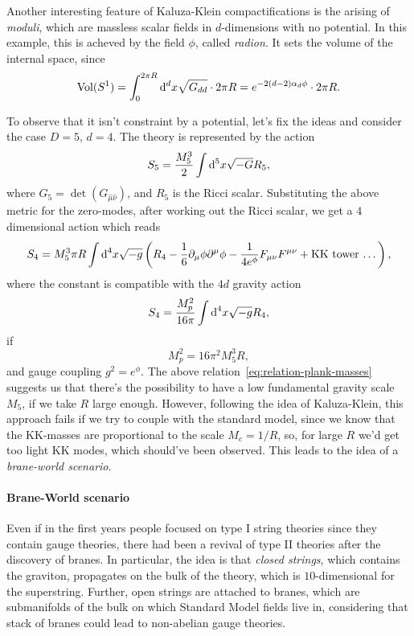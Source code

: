 Another interesting feature of Kaluza-Klein compactifications is the arising of \emph{moduli}, which are massless scalar fields in $d$-dimensions with no potential. In this example, this is acheved by the field $\phi$, called \emph{radion}. It sets the volume of the internal space, since
\begin{equation}
    \textup{Vol} (S^1)  = \int_{0}^{2\pi R} \mathop{}\!\mathrm{d}^d x \sqrt{G_{dd}} \cdot 2\pi R = e^{-2(d-2)\alpha_d \phi} \cdot 2\pi R .
\end{equation}

To observe that it isn't constraint by a potential, let's fix the ideas and consider the case $D=5$, $d=4$. The theory is represented by the action
\begin{equation}
    S_5 = \frac{M^3_5}{2} \int \mathop{}\!\mathrm{d}^5 x \sqrt{-G} R_5,
\end{equation}
where $G_5 = \det(G_{\hat{\mu} \hat{\nu}})$, and $R_5$ is the Ricci scalar. Substituting the above metric for the zero-modes, after working out the Ricci scalar, we get a $4$ dimensional action which reads
\begin{equation}
    S_4 = M^3_5 \pi R \int {\mathop{}\!\mathrm{d}}^4 x \sqrt{-g} \left( R_4 -\frac{1}{6} \partial_\mu \phi \partial^\mu \phi - \frac{1}{4 e^\phi} F_{\mu\nu} F^{\mu\nu} + \textup{KK tower \dots} \right),
\end{equation}
where the constant is compatible with the $4d$ gravity action
\begin{equation}
    S_4 = \frac{M^2_p}{16\pi} \int {\mathop{}\!\mathrm{d}}^4 x \sqrt{-g} R_4 ,
\end{equation}
if
\begin{equation}\label{eq:relation-plank-masses}
    M^2_p = 16 \pi^2 M^3_5 R,
\end{equation}
and gauge coupling $g^2 = e^\phi$. The above relation~\eqref{eq:relation-plank-masses} suggests us that there's the possibility to have a low fundamental gravity scale $M_5$, if we take $R$ large enough. However, following the idea of Kaluza-Klein, this approach fails if we try to couple with the standard model, since we know that the KK-masses are proportional to the scale $M_c = 1/R$, so, for large $R$ we'd get too light KK modes, which should've been observed. This leads to the idea of a \emph{brane-world scenario}.

\paragraph{Brane-World scenario}
Even if in the first years people focused on type I string theories since they contain gauge theories, there had been a revival of type II theories after the discovery of branes. In particular, the idea is that \emph{closed strings}, which contains the graviton, propagates on the bulk of the theory, which is $10$-dimensional for the superstring. Further, open strings are attached to branes, which are submanifolds of the bulk on which Standard Model fields live in, considering that stack of branes could lead to non-abelian gauge theories. 

